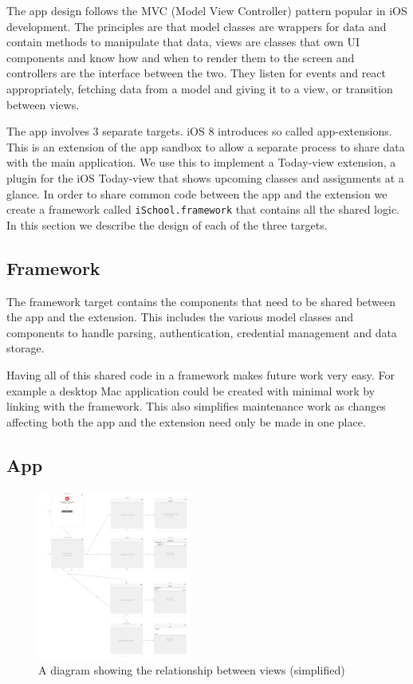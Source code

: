 \documentclass[pdftex, DIV=calc, paper=a4, fontsize=11pt, twocolumn]{scrartcl}	 %
\begin{document}
The app design follows the MVC (Model View Controller) pattern popular in iOS development.
The principles are that model classes are wrappers for data and contain methods to manipulate that
data, views are classes that own UI components and know how and when to render them to the screen
and controllers are the interface between the two. They listen for events and react appropriately, 
fetching data from a model and giving it to a view, or transition between views.

The app involves 3 separate targets. iOS 8 introduces so called app-extensions. This is an extension
of the app sandbox to allow a separate process to share data with the main application. We use
this to implement a Today-view extension, a plugin for the iOS Today-view that shows upcoming classes
and assignments at a glance. In order to share common code between the app and the extension we
create a framework called \texttt{iSchool.framework} that contains all the shared logic. In this 
section we describe the design of each of the three targets.

\subsection*{Framework}
The framework target contains the components that need to be shared between the app and the extension.
This includes the various model classes and components to handle parsing, authentication, credential
management and data storage.

Having all of this shared code in a framework makes future work very easy. For example a desktop Mac
application could be created with minimal work by linking with the framework. This also simplifies
maintenance work as changes affecting both the app and the extension need only be made in one place.

\subsection*{App}

\begin{figure}
    \includegraphics[width=0.45\textwidth]{view-tree.png}
    \caption{A diagram showing the relationship between views (simplified)}
    \label{fig:hierarchy}
\end{figure}
\end{document}
